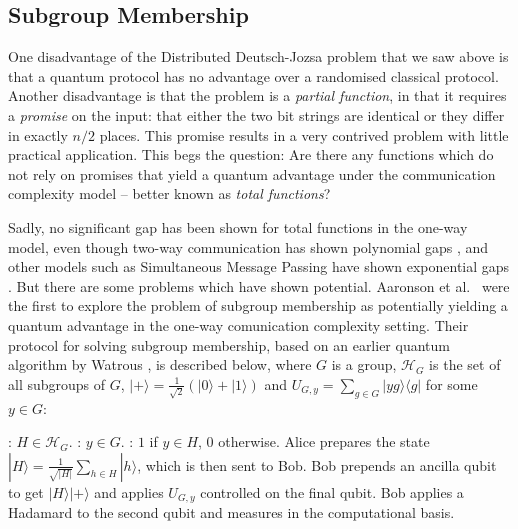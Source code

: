 \documentclass[a4paper]{article}
\begin{document}
        \subsection{Subgroup Membership}

        One disadvantage of the Distributed Deutsch-Jozsa problem that we saw above is that a quantum protocol has no advantage over a randomised classical protocol. Another disadvantage is that the problem is a {\em partial function}, in that it requires a {\em promise} on the input: that either the two bit strings are identical or they differ in exactly $n/2$ places. This promise results in a very contrived problem with little practical application. This begs the question: Are there any functions which do not rely on promises that yield a quantum advantage under the communication complexity model -- better known as {\em total functions}?

        Sadly, no significant gap has been shown for total functions in the one-way model, even though two-way communication has shown polynomial gaps \cite{Buhrman:1998:QVC:276698.276713}, and other models such as Simultaneous Message Passing have shown exponential gaps \cite{PhysRevLett.87.167902}. But there are some problems which have shown potential. Aaronson et al.~\cite{0902.3175} were the first to explore the problem of subgroup membership as potentially yielding a quantum advantage in the one-way comunication complexity setting. Their protocol for solving subgroup membership, based on an earlier quantum algorithm by Watrous \cite{Watrous:2000:SQP:795666.796590}, is described below, where $G$ is a group, $\mathscr{H}_G$ is the set of all subgroups of $G$, $|+\rangle = \frac{1}{\sqrt{2}}(|0\rangle + |1\rangle)$ and $U_{G, y} = \sum_{g \in G}|yg\rangle\langle g|$ for some $y \in G$:

        \begin{codebox}
            \zi {}: $H \in \mathscr{H}_G$.
            \zi {}: $y \in G$.
            \zi {}: $1$ if $y \in H$, $0$ otherwise.
            \li Alice prepares the state $|H\rangle = \frac{1}{\sqrt{|H|}}\sum_{h \in H}|h\rangle$, which is then sent to Bob.
            \li Bob prepends an ancilla qubit to get $|H\rangle|+\rangle$ and applies $U_{G, y}$ controlled on the final qubit.
            \li Bob applies a Hadamard to the second qubit and measures in the computational basis.
        \end{codebox}
\end{document}
